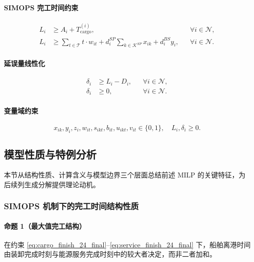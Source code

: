 \documentclass[UTF8, a4paper, 12pt]{ctexart}
\theoremstyle{plain}
\theoremstyle{definition}
\theoremstyle{remark}
\begin{document}
\paragraph{SIMOPS 完工时间约束}
\begin{align}
L_i &\ge A_i + T^{(i)}_{\text{cargo}},
&& \forall i \in \mathcal{N},
\label{eq:cargo_finish_24_final} \\
L_i &\ge 
\sum_{t \in \mathcal{T}} t \cdot w_{it}
+ d_i^{SP}\sum_{k \in \mathcal{K}^{SP}} x_{ik}
+ d_i^{BS} y_i,
&& \forall i \in \mathcal{N}.
\label{eq:service_finish_24_final}
\end{align}

\paragraph{延误量线性化}
\begin{align}
\delta_i &\ge L_i - D_i,
&& \forall i \in \mathcal{N}, \\
\delta_i &\ge 0,
&& \forall i \in \mathcal{N}.
\end{align}

\paragraph{变量域约束}
\begin{equation}
x_{ik},y_i,z_i,w_{it},s_{ikt},b_{it},u_{ikt},v_{it} \in \{0,1\},
\quad
L_i,\delta_i \ge 0.
\end{equation}

\subsection{模型性质与特例分析}
\label{sec:properties}

本节从结构性质、计算含义与模型边界三个层面总结前述 MILP 的关键特征，为后续列生成分解提供理论动机。

\subsubsection{SIMOPS 机制下的完工时间结构性质}

\paragraph{命题 1（最大值完工结构）}
在约束 \eqref{eq:cargo_finish_24_final}--\eqref{eq:service_finish_24_final} 下，船舶离港时间由装卸完成时刻与能源服务完成时刻中的较大者决定，而非二者加和。
\end{document}
